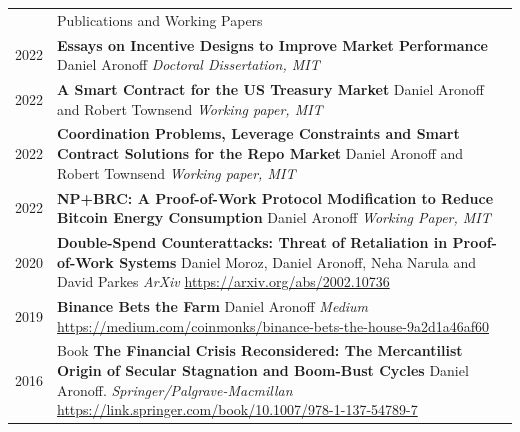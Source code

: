 \documentclass[letterpaper, 11pt]{article}
\newcommand{\headingfont}{\Large\color{OliveGreen}}
\newenvironment{SectionTable}[1]{
	\renewcommand*{\arraystretch}{1.7}
	\setlength{\tabcolsep}{10pt}
	\begin{longtable}{Rp{5.2in}} & #1 \\}
{\end{longtable}\vspace{-.3cm}}
\begin{document}
\begin{SectionTable}{\headingfont Publications and Working Papers}
2022 &
\textbf{Essays on Incentive Designs to Improve Market Performance}\newline
Daniel Aronoff\newline
\textit{Doctoral Dissertation, MIT}\\

2022 &
\textbf{A Smart Contract for the US Treasury Market}\newline
Daniel Aronoff and Robert Townsend\newline
\textit{Working paper, MIT}\\

2022 & 
\textbf{Coordination Problems, Leverage Constraints and Smart Contract Solutions for the Repo Market} \newline
Daniel Aronoff and Robert Townsend \newline
\textit{Working paper, MIT} \\

2022 & 
\textbf{NP+BRC: A Proof-of-Work Protocol Modification to Reduce Bitcoin Energy Consumption} \newline
Daniel Aronoff \newline
\textit{Working Paper, MIT} \\

2020 & 
\textbf{Double-Spend Counterattacks: Threat of Retaliation in Proof-of-Work Systems} \newline
Daniel Moroz, Daniel Aronoff, Neha Narula and David Parkes \newline
\textit{ArXiv}\newline
{\small{\url{https://arxiv.org/abs/2002.10736}}}\\

2019 & 
\textbf{Binance Bets the Farm} \newline
Daniel Aronoff \newline
\textit{Medium}\newline
{\small{{\url{https://medium.com/coinmonks/binance-bets-the-house-9a2d1a46af60 }}}}\\

2016 & 
Book\newline
\textbf{The Financial Crisis Reconsidered: The Mercantilist Origin of Secular Stagnation and Boom-Bust Cycles} \newline
Daniel Aronoff. \newline
\textit{Springer/Palgrave-Macmillan}\newline
{\small{\url{https://link.springer.com/book/10.1007/978-1-137-54789-7 }}}\newline\\


\end{SectionTable}
\end{document}
